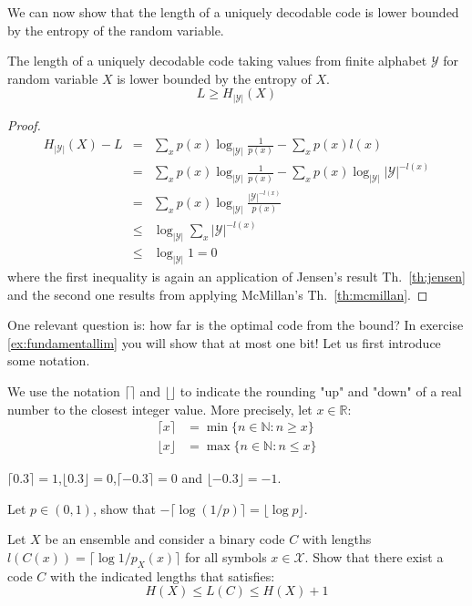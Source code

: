 We can now show that the length  of a uniquely decodable code is lower bounded by the entropy of the random variable.
\begin{theorem}
\label{th:sourcecoding}
The length of a uniquely decodable code taking values from finite alphabet $\mathcal{Y}$ for random variable ${X}$ is lower bounded by the entropy of ${X}$.
\begin{equation*}
L\geq H_{|\mathcal{Y}|}({X})
\end{equation*}
\end{theorem}
\begin{proof}
\begin{eqnarray}
H_{|\mathcal{Y}|}({X}) - L &=& \sum_{x} p(x) \log_{|\mathcal{Y}|} \frac{1}{p(x)} - \sum_{x}p(x)l(x) \nonumber \\
                                      &=& \sum_{x} p(x) \log_{|\mathcal{Y}|} \frac{1}{p(x)} - \sum_{x} p(x)  \log_{|\mathcal{Y}|} |\mathcal{Y}|^{-l(x)} \nonumber \\
                                      &=& \sum_{x} p(x) \log_{|\mathcal{Y}|} \frac{|\mathcal{Y}|^{-l(x)} }{p(x)} \nonumber \\
                                      &\leq & \log_{|\mathcal{Y}|} \sum_{x} |\mathcal{Y}|^{-l(x)} \nonumber \\
                                      &\leq & \log_{|\mathcal{Y}|} 1 = 0
\end{eqnarray}
\noindent where the first inequality is again an application of Jensen's result Th.~\ref{th:jensen} and the second one results from applying McMillan's Th.~\ref{th:mcmillan}.
\end{proof}
One relevant question is: how far is the optimal code from the bound? In exercise \ref{ex:fundamentallim} you will show that at most one bit! Let us first introduce some notation.
\begin{definition}
We use the notation $\lceil\rceil$ and $\lfloor\rfloor$ to indicate the rounding "up" and "down" of a real number to the closest integer value. More precisely, let $x\in\mathbb R$:
\begin{align}
\lceil x \rceil &= \min\{n\in\mathbb N: n\geq x\}\\
\lfloor x \rfloor &= \max\{n\in\mathbb N: n\leq x\}
\end{align}
\end{definition}
\begin{example}
$\lceil 0.3\rceil =1$,$\lfloor 0.3\rfloor =0$,$\lceil -0.3\rceil =0$ and $\lfloor -0.3\rfloor =-1$.
\end{example}
\begin{exercise} Let $p\in(0,1)$, show that $-\lceil \log (1/p)\rceil=\lfloor\log p\rfloor$.
\end{exercise}
\begin{exercise}
\label{ex:fundamentallim}
Let $X$ be an ensemble and consider a binary code $C$ with lengths $l(C(x))=\lceil \log 1/p_X(x)\rceil$ for all symbols $x\in\mathcal X$. Show that there exist a code $C$  with the indicated lengths that satisfies:
\begin{equation}
H(X)\leq L(C)\leq H(X)+1
\end{equation}
\end{exercise}

